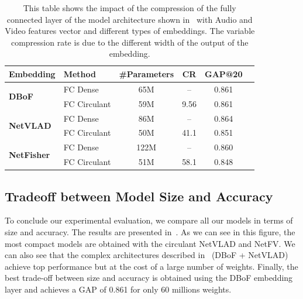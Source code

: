 \begin{table}[ht]
  \centering
  \begin{tabular}{llcccc}
    \toprule
    \textbf{Embedding} & \textbf{Method} & \textbf{\#Parameters} & \textbf{CR} & \textbf{GAP@20} \\
    \midrule
    \multirow{2}{*}{\textbf{DBoF}} & FC Dense & 65M & -- & 0.861 \\
     & FC Circulant & 59M & 9.56 & 0.861 \\
    \midrule
    \multirow{2}{*}{\textbf{NetVLAD}} & FC Dense & 86M & -- & 0.864 \\
     &FC Circulant & 50M & 41.1 & 0.851 \\
    \midrule
    \multirow{2}{*}{\textbf{NetFisher}} & FC Dense & 122M & -- & 0.860 \\
     & FC Circulant & 51M & 58.1 & 0.848 \\
    \bottomrule
  \end{tabular}
  \caption{This table shows the impact of the compression of the fully connected layer of the model architecture shown in~ with Audio and Video features vector and different types of embeddings. The variable compression rate is due to the different width of the output of the embedding.}
  \label{table:ap2-fc_circulant_with_diff_embedding}
\end{table}





\subsection{Tradeoff between Model Size and Accuracy}
\label{subsection:ap2-tradeoff_between_model_size_and_accuracy}

%   

To conclude our experimental evaluation, we compare all our models in terms of size and accuracy.
The results are presented in~. 
As we can see in this figure, the most compact models are obtained with the circulant NetVLAD and NetFV.
We can also see that the complex architectures described in~ (DBoF + NetVLAD) achieve top performance but at the cost of a large number of weights.
Finally, the best trade-off between size and accuracy is obtained using the DBoF embedding layer and achieves a GAP of 0.861 for only 60 millions weights.


